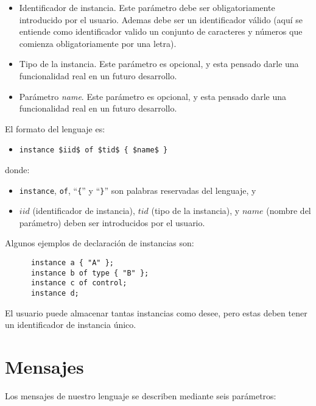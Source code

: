 \begin{itemize}
\item Identificador de instancia. Este parámetro debe ser
  obligatoriamente introducido por el usuario. Ademas debe ser un
  identificador válido (aquí se entiende como identificador valido un
  conjunto de caracteres y números que comienza obligatoriamente por
  una letra).
\item Tipo de la instancia. Este parámetro es opcional, y esta pensado
  darle una funcionalidad real en un futuro desarrollo.
\item Parámetro \textit{name}. Este parámetro es opcional, y esta
  pensado darle una funcionalidad real en un futuro desarrollo.
\end{itemize}

El formato del lenguaje es:

\begin{itemize}
\item \lstinline[mathescape]!instance $iid$ of $tid$ { $name$ }!
\end{itemize}
donde:
\begin{itemize}
\item \lstinline{instance}, \lstinline{of}, ``\lstinline!{!'' y
    ``\lstinline!}!'' son palabras reservadas del lenguaje, y
\item $iid$ (identificador de instancia), $tid$ (tipo de la
  instancia), y $name$ (nombre del parámetro) deben ser introducidos
  por el usuario.
\end{itemize}

Algunos ejemplos de declaración de instancias son:

\begin{lstlisting}
      instance a { "A" };
      instance b of type { "B" };
      instance c of control;
      instance d;
\end{lstlisting}

El usuario puede almacenar tantas instancias como desee, pero estas
deben tener un identificador de instancia único.

\section{Mensajes}\label{sec:Mensajes}

Los mensajes de nuestro lenguaje se describen mediante seis
parámetros:

